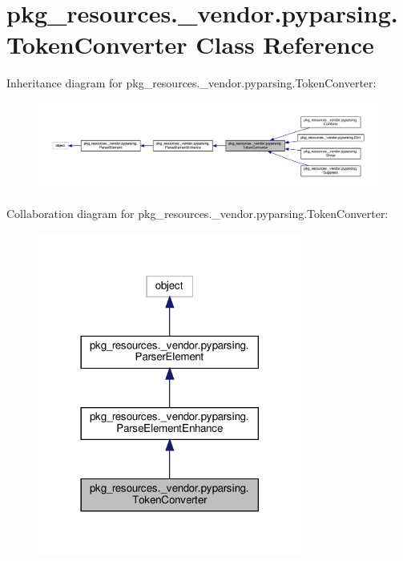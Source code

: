 \hypertarget{classpkg__resources_1_1__vendor_1_1pyparsing_1_1TokenConverter}{}\section{pkg\+\_\+resources.\+\_\+vendor.\+pyparsing.\+Token\+Converter Class Reference}
\label{classpkg__resources_1_1__vendor_1_1pyparsing_1_1TokenConverter}


Inheritance diagram for pkg\+\_\+resources.\+\_\+vendor.\+pyparsing.\+Token\+Converter\+:
\nopagebreak
\begin{figure}[H]
\begin{center}
\leavevmode
\includegraphics[width=350pt]{classpkg__resources_1_1__vendor_1_1pyparsing_1_1TokenConverter__inherit__graph}
\end{center}
\end{figure}


Collaboration diagram for pkg\+\_\+resources.\+\_\+vendor.\+pyparsing.\+Token\+Converter\+:
\nopagebreak
\begin{figure}[H]
\begin{center}
\leavevmode
\includegraphics[width=246pt]{classpkg__resources_1_1__vendor_1_1pyparsing_1_1TokenConverter__coll__graph}
\end{center}
\end{figure}
